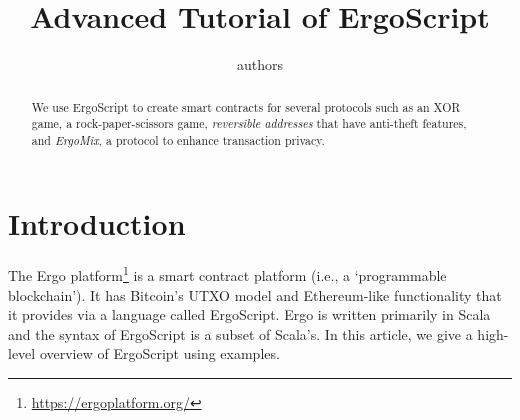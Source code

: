 \documentclass[11pt]{article}
\newcommand{\langname}{ErgoScript\xspace}
\newcommand{\mixname}{ErgoMix\xspace}
\begin{document}
\title{Advanced Tutorial of \langname}


\author{authors}


\maketitle


\begin{abstract}
We use \langname to create smart contracts for several protocols such as an XOR game, a rock-paper-scissors game, {\em reversible addresses} that have anti-theft features, and {\em \mixname}, a protocol to enhance transaction privacy. 

\end{abstract}


\section{Introduction}

The Ergo platform\footnote{\url{https://ergoplatform.org/}} is a smart contract platform (i.e., a `programmable blockchain'). It has Bitcoin's UTXO model and Ethereum-like functionality that it provides via a language called \langname. Ergo is written primarily in Scala and the syntax of \langname is a subset of Scala's. In this article, we give a high-level overview of \langname using examples.

\end{document}
